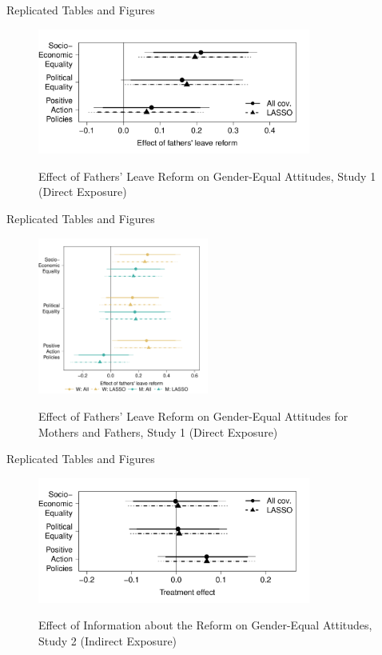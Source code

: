 \documentclass{beamer}
\begin{document}
	\begin{frame}{Replicated Tables and Figures}
		\begin{figure}
			\centering
			\captionsetup{justification=centering, labelsep=period} 
			\caption{Effect of Fathers’ Leave Reform on Gender-Equal Attitudes, Study 1 (Direct Exposure)}
			\includegraphics[width=0.8\textwidth]{Fig1}
			\label{fig:my_label1}
		\end{figure}
	\end{frame}
	
	\begin{frame}{Replicated Tables and Figures}
		\begin{figure}
			\centering
			\captionsetup{justification=centering, labelsep=period} 
			\caption{Effect of Fathers’ Leave Reform on Gender-Equal Attitudes for Mothers and Fathers, Study 1 (Direct Exposure)}
			\includegraphics[width=0.5\textwidth]{Fig2}
			\label{fig:my_label2}
		\end{figure}
	\end{frame}
	
	\begin{frame}{Replicated Tables and Figures}
		\begin{figure}
			\centering
			\captionsetup{justification=centering, labelsep=period}
			\caption{Effect of Information about the Reform on Gender-Equal Attitudes, Study 2 (Indirect Exposure)}
			\includegraphics[width=0.8\textwidth]{Fig3}
			\label{fig:my_label3}
		\end{figure}
	\end{frame}
	
\end{document}
